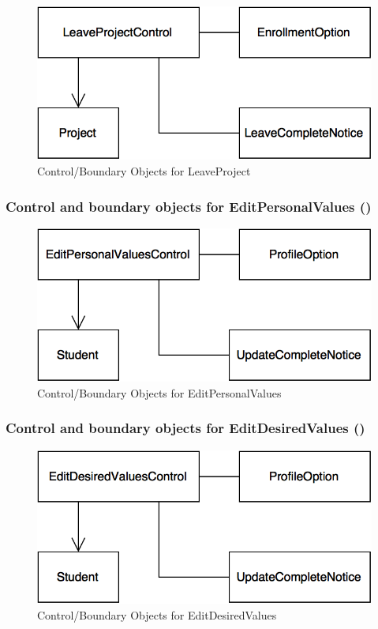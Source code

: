 \documentclass[12pt,letterpaper]{article}
\begin{document}
\begin{figure}[H]
	\centering{}
	\includegraphics[scale=0.4]{imgs/cbod/leave-project.png}
	\caption{Control/Boundary Objects for LeaveProject}    
\end{figure}

\subsubsection*{Control and boundary objects for EditPersonalValues (\editpersonalvalues{})}

\begin{figure}[H]
	\centering{}
	\includegraphics[scale=0.4]{imgs/cbod/edit-personal-values.png}
	\caption{Control/Boundary Objects for EditPersonalValues}    
\end{figure}

\subsubsection*{Control and boundary objects for EditDesiredValues (\editdesiredvalues{})}

\begin{figure}[H]
	\centering{}
	\includegraphics[scale=0.4]{imgs/cbod/edit-desired-values.png}
	\caption{Control/Boundary Objects for EditDesiredValues}    
\end{figure}
\end{document}
